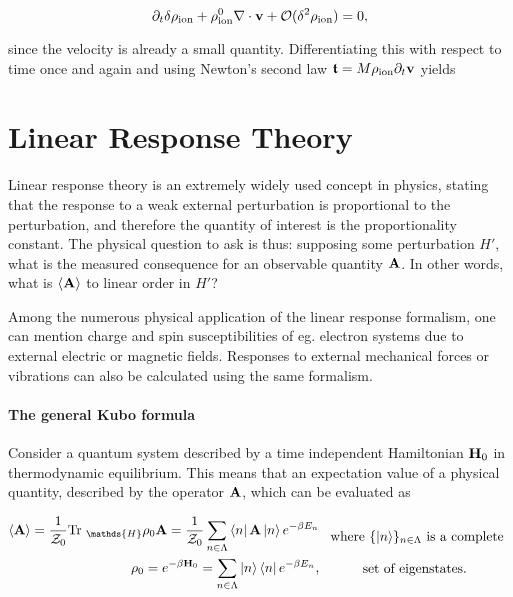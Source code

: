 \documentclass{homework}
\begin{document}
$$
\partial_t \delta \rho_{\textnormal{ion}} +  \rho^0_{\textnormal{ion}} \nabla \cdot {\bf v} + \mathcal{O}(\delta^2 \rho_{\textnormal{ion}}) = 0,
$$

since the velocity is already a small quantity. Differentiating this with respect to time once and again and using Newton's second law $\bm{\mathfrak{t}} = M \rho_{\textnormal{ion}} \partial_t {\bf v}$ yields 


\clearpage

\section{Linear Response Theory}

Linear response theory is an extremely widely used concept in physics, stating that the response to a weak external perturbation is proportional to the perturbation, and therefore the quantity of interest is the proportionality constant. The physical question to ask is thus: supposing some perturbation $H'$, what is the measured consequence for an observable quantity ${\bf A}$. In other words, what is $\langle {\bf A} \rangle$ to linear order in $H'$? 

Among the numerous physical application of the linear response formalism, one can mention charge and spin susceptibilities of eg. electron systems due to external electric or magnetic fields. Responses to external mechanical forces or vibrations can also be calculated using the same formalism. \\

\paragraph{\textbf{The general Kubo formula}}

Consider a quantum system described by a time independent Hamiltonian ${\bf H}_0$ in thermodynamic equilibrium. This means that an expectation value of a physical quantity, described by the operator ${\bf A}$, which can be evaluated as 

\begin{equation}
    \begin{split}
        \langle {\bf A} \rangle = \frac{1}{\mathcal{Z}_0} \textnormal{Tr }_{\mathds{H}} \rho_0 {\bf A}  = \frac{1}{\mathcal{Z}_0} \sum_{n \in \Lambda} \bra{n} {{\bf A}} \ket{n} e^{-\beta E_n} \\
        \rho_0 = e^{-\beta {\bf H}_0} = \sum_{n \in \Lambda} \ket{n} \bra{n} e^{-\beta E_n},
    \end{split} \begin{array}{c}
         \textnormal{ where $\{\ket{n}\}_{n \in \Lambda}$ is a complete} \\
         \\
         \textnormal{set of eigenstates}.
    \end{array}
\end{equation}
\end{document}

